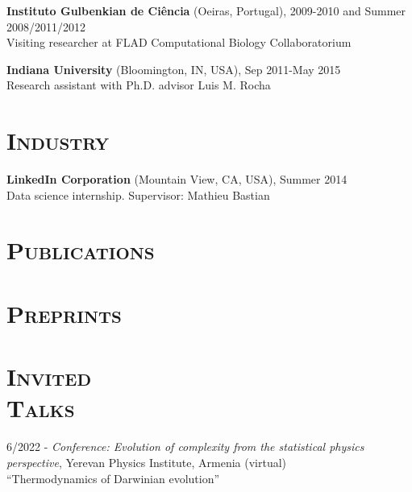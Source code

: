 \documentclass[margin,line,centered]{res}
\begin{document}
\begin{resume}
\textbf{Instituto Gulbenkian de Ciência} (Oeiras, Portugal), 2009-2010 and Summer 2008/2011/2012 \\
Visiting researcher at FLAD Computational Biology Collaboratorium

\textbf{Indiana University} (Bloomington, IN, USA), Sep 2011-May 2015\\
Research assistant with Ph.D. advisor Luis M. Rocha 

\section{\textsc{Industry}}

\textbf{LinkedIn Corporation} (Mountain View, CA, USA), Summer 2014\\
Data science internship. Supervisor: Mathieu Bastian

\section{\textsc{Publications}}


\section{\textsc{Preprints}}


\section{\textsc{Invited\\Talks}}

6/2022 - \emph{Conference: Evolution of complexity from the statistical physics perspective}, Yerevan Physics Institute, Armenia (virtual)\\
``Thermodynamics of Darwinian evolution''


\end{resume}
\end{document}
